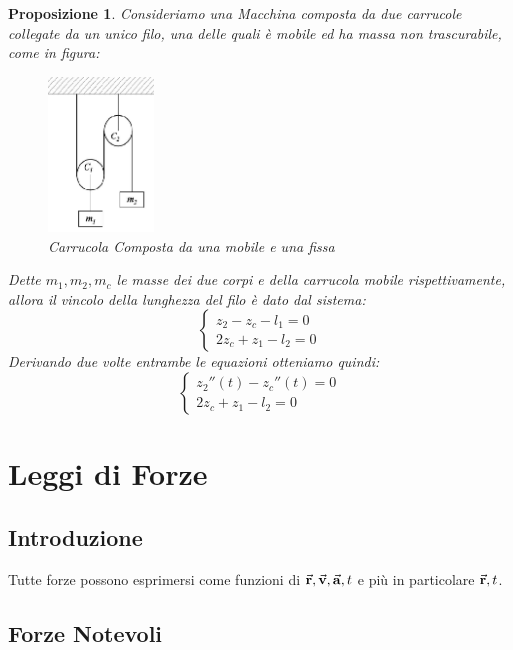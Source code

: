\documentclass{article}
\newtheorem{prop}[defn]{Proposizione}
\renewcommand{\a}{\va{a}}
\renewcommand{\v}{\va{v}}
\renewcommand{\r}{\va{r}}
\begin{document}
\begin{prop}
Consideriamo una Macchina composta da due carrucole collegate da un unico filo, una delle quali è mobile ed ha massa non trascurabile, come in figura: 
\begin{figure}[H]
    \centering
    \includegraphics[width=0.25\textwidth]{2i8g76b.png}
    \caption{Carrucola Composta da una mobile e una fissa}
    \label{carrucolamobile}
\end{figure}

Dette $m_1,m_2,m_c$ le masse dei due corpi e della carrucola mobile rispettivamente, allora il vincolo della lunghezza del filo è dato dal sistema:
\[\left\{\begin{array}{l}
    z_2-z_c-l_1=0  \\
    2z_c+z_1-l_2=0 
\end{array}\right.\]
Derivando due volte entrambe le equazioni otteniamo quindi:
\[\left\{\begin{array}{l}
    z_2''(t)-z_c''(t)=0  \\
    2z_c+z_1-l_2=0 
\end{array}\right.\]
\end{prop}


\section{Leggi di Forze}

\subsection{Introduzione}
Tutte forze possono esprimersi come funzioni di $\r,\v,\a,t$ e più in particolare $\r,t$.

\subsection{Forze Notevoli}
\end{document}
